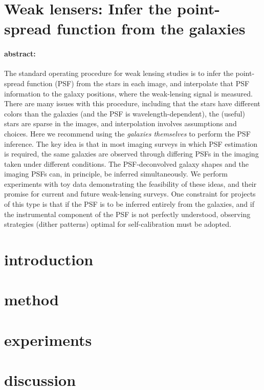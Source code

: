 \documentclass[12pt,letterpaper]{article}
\begin{document}
\sloppy\sloppypar

\section*{Weak lensers: Infer the point-spread function from the galaxies}

\paragraph{abstract:}
The standard operating procedure for weak lensing studies is
  to infer the point-spread function (PSF) from the stars in each image,
  and interpolate that PSF information to the galaxy positions,
  where the weak-lensing signal is measured.
There are many issues with this procedure, including that
  the stars have different colors than the galaxies (and the PSF is wavelength-dependent),
  the (useful) stars are sparse in the images,
  and interpolation involves assumptions and choices.
Here we recommend using the \emph{galaxies themselves} to perform the PSF inference.
The key idea is that in most imaging surveys in which PSF estimation is required,
  the same galaxies are observed through differing PSFs in the imaging taken
  under different conditions.
The PSF-deconvolved galaxy shapes and the imaging PSFs can, in principle,
  be inferred simultaneously.
We perform experiments with toy data demonstrating the feasibility of these ideas,
  and their promise for current and future weak-lensing surveys.
One constraint for projects of this type is that if the PSF is to be
  inferred entirely from the galaxies,
  and if the instrumental component of the PSF is not perfectly understood,
  observing strategies (dither patterns) optimal for self-calibration must be adopted.

\section{introduction}

\section{method}

\section{experiments}

\section{discussion}
\end{document}
